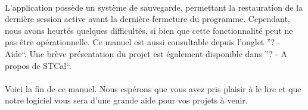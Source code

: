 \documentclass[a4paper,10pt]{report}
\begin{document}
	\paragraph{}
	  L'application possède un système de sauvegarde, permettant la restauration de la dernière session active avant la dernière fermeture du programme.
	  Cependant, nous avons heurtés quelques difficultés, si bien que cette fonctionnalité peut ne pas être opérationnelle.
	  Ce manuel est aussi consultable depuis l'onglet ''? - Aide``.
	  Une brève présentation du projet est également disponible dans ''? - A propos de STCal``.
	

	\paragraph{}
	  Voici la fin de ce manuel.
	  Nous espérons que vous avez pris plaisir à le lire et que notre logiciel vous sera d'une grande aide pour vos projets à venir.
\end{document}
